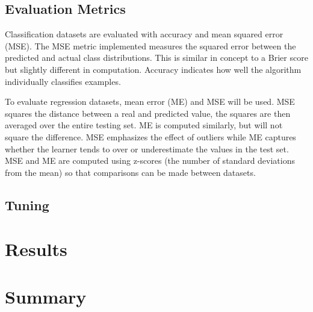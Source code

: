 \documentclass[twoside,11pt]{article}
\begin{document}
\subsection{Evaluation Metrics}

	Classification datasets are evaluated with accuracy and mean squared error (MSE). 
	The MSE metric implemented measures the squared error between the predicted and actual class distributions. 
	This is similar in concept to a Brier score but slightly different in computation. Accuracy indicates how well the algorithm individually classifies examples.
	
	To evaluate regression datasets, mean error (ME) and MSE will be used. MSE squares the distance between a real and predicted value, the squares are then averaged over the entire testing set. 
	ME is computed similarly, but will not square the difference. MSE emphasizes the effect of outliers while ME captures whether the learner tends to over or underestimate the values in the test set. 
	MSE and ME are computed using z-scores (the number of standard deviations from the mean) so that comparisons can be made between datasets.

\subsection{Tuning}

\section{Results}

\section{Summary}

\newpage


\end{document}
